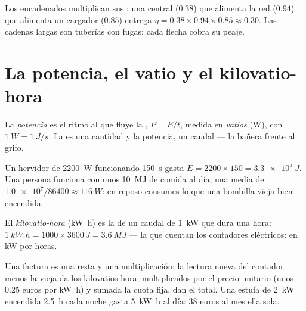 \begin{remark}\label{rem:g10:energy-conservation:chain-eta}
Los  encadenados multiplican sus : una central
($0.38$) que alimenta la red ($0.94$) que alimenta un cargador ($0.85$)
entrega $\eta = 0.38 \times 0.94 \times 0.85 \approx 0.30$. Las cadenas
largas son tuberías con fugas: cada flecha cobra su peaje.
\end{remark}

\section{La potencia, el vatio y el kilovatio-hora}

\begin{definition}[Potencia]\label{def:g10:energy-conservation:power}
La \emph{potencia} es el ritmo al que fluye la ,
$P = E/t$, medida en \emph{vatios} (\unit{W}), con
$\qty{1}{W} = \qty{1}{J/s}$. La  es una cantidad y la potencia,
un caudal --- la bañera frente al grifo.
\end{definition}

\begin{example}\label{ex:g10:energy-conservation:power}
Un hervidor de \qty{2200}{W} funcionando \qty{150}{s} gasta
$E = 2200 \times 150 = \qty{3.3e5}{J}$. Una persona funciona con unos
\qty{10}{MJ} de comida al día, una media de
$\num{1.0e7}/\num{86400} \approx \qty{116}{W}$: en reposo consumes lo
que una bombilla vieja bien encendida.
\end{example}

\begin{definition}\label{def:g10:energy-conservation:kwh}
El \emph{kilovatio-hora} (\unit{kW.h}) es la
 de un caudal de \qty{1}{kW} que dura una hora:
$\qty{1}{kW.h} = 1000 \times 3600\,\unit{J} = \qty{3.6}{MJ}$ --- la
 que cuentan los contadores eléctricos:  en \unit{kW} por
horas.
\end{definition}

\begin{example}\label{ex:g10:energy-conservation:bill}
Una factura es una resta y una multiplicación: la lectura nueva del
contador menos la vieja da los kilovatios-hora; multiplicados por el
precio unitario (unos $0.25$ euros por \unit{kW.h}) y sumada la cuota
fija, dan el total. Una estufa de \qty{2}{kW} encendida \qty{2.5}{h}
cada noche gasta \qty{5}{kW.h} al día: $38$ euros al mes ella sola.
\end{example}

